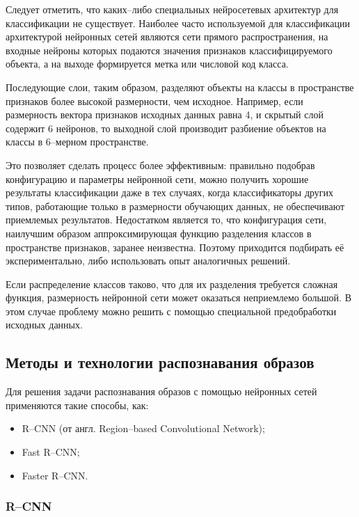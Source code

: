 Следует отметить, что каких--либо специальных нейросетевых архитектур для классификации не существует. Наиболее часто используемой для классификации архитектурой нейронных сетей являются сети прямого распространения, на входные нейроны которых подаются значения признаков классифицируемого объекта, а на выходе формируется метка или числовой код класса.

Последующие слои, таким образом, разделяют объекты на классы в пространстве признаков более высокой размерности, чем исходное. Например, если размерность вектора признаков исходных данных равна 4, и скрытый слой содержит 6 нейронов, то выходной слой производит разбиение объектов на классы в 6--мерном пространстве.

Это позволяет сделать процесс более эффективным: правильно подобрав конфигурацию и параметры нейронной сети, можно получить хорошие результаты классификации даже в тех случаях, когда классификаторы других типов, работающие только в размерности обучающих данных, не обеспечивают приемлемых результатов. Недостатком является то, что конфигурация сети, наилучшим образом аппроксимирующая функцию разделения классов в пространстве признаков, заранее неизвестна. Поэтому приходится подбирать её экспериментально, либо использовать опыт аналогичных решений.

Если распределение классов таково, что для их разделения требуется сложная функция, размерность нейронной сети может оказаться неприемлемо большой. В этом случае проблему можно решить с помощью специальной предобработки исходных данных.

\subsection{Методы и технологии распознавания образов}

Для решения задачи распознавания образов с помощью нейронных сетей применяются такие способы, как:
\begin{itemize}[leftmargin=1.6\parindent]
	\item R--CNN (от англ. Region--based Convolutional Network);
	\item Fast R--CNN;
	\item Faster R--CNN. 
\end{itemize}

\subsubsection{R--CNN}


